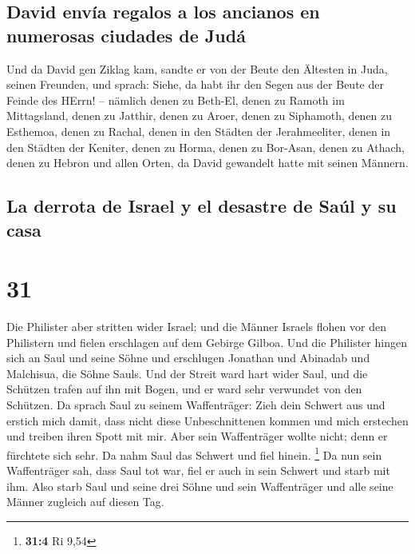 \hypertarget{david-envuxeda-regalos-a-los-ancianos-en-numerosas-ciudades-de-juduxe1}{%
\subsection{David envía regalos a los ancianos en numerosas ciudades de
Judá}\label{david-envuxeda-regalos-a-los-ancianos-en-numerosas-ciudades-de-juduxe1}}

 Und da David gen Ziklag kam, sandte er von der Beute den
Ältesten in Juda, seinen Freunden, und sprach: Siehe, da habt ihr den
Segen aus der Beute der Feinde des HErrn! --  nämlich
denen zu Beth-El, denen zu Ramoth im Mittagsland, denen zu Jatthir,
 denen zu Aroer, denen zu Siphamoth, denen zu Esthemoa,
 denen zu Rachal, denen in den Städten der Jerahmeeliter,
denen in den Städten der Keniter,  denen zu Horma, denen
zu Bor-Asan, denen zu Athach,  denen zu Hebron und allen
Orten, da David gewandelt hatte mit seinen Männern.

\hypertarget{la-derrota-de-israel-y-el-desastre-de-sauxfal-y-su-casa}{%
\subsection{La derrota de Israel y el desastre de Saúl y su
casa}\label{la-derrota-de-israel-y-el-desastre-de-sauxfal-y-su-casa}}

\hypertarget{section-30}{%
\section{31}\label{section-30}}

 Die Philister aber stritten wider Israel; und die Männer
Israels flohen vor den Philistern und fielen erschlagen auf dem Gebirge
Gilboa.  Und die Philister hingen sich an Saul und seine
Söhne und erschlugen Jonathan und Abinadab und Malchisua, die Söhne
Sauls.  Und der Streit ward hart wider Saul, und die
Schützen trafen auf ihn mit Bogen, und er ward sehr verwundet von den
Schützen.  Da sprach Saul zu seinem Waffenträger: Zieh
dein Schwert aus und erstich mich damit, dass nicht diese
Unbeschnittenen kommen und mich erstechen und treiben ihren Spott mit
mir. Aber sein Waffenträger wollte nicht; denn er fürchtete sich sehr.
Da nahm Saul das Schwert und fiel hinein. \footnote{\textbf{31:4} Ri
  9,54}  Da nun sein Waffenträger sah, dass Saul tot war,
fiel er auch in sein Schwert und starb mit ihm.  Also
starb Saul und seine drei Söhne und sein Waffenträger und alle seine
Männer zugleich auf diesen Tag.

